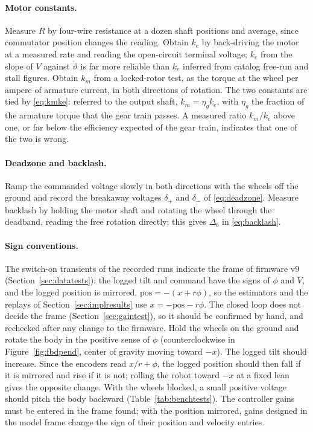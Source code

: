 \paragraph{Motor constants.} Measure $R$ by four-wire resistance at a dozen
shaft positions and average, since commutator position changes the reading.
Obtain $k_e$ by back-driving the motor at a measured rate and reading the
open-circuit terminal voltage; $k_e$ from the slope of $V$ against
$\dot\vartheta$ is far more reliable than $k_e$ inferred from catalog free-run
and stall figures. Obtain $k_m$ from a locked-rotor test, as the torque at the
wheel per ampere of armature current, in both directions of rotation. The two
constants are tied by \eqref{eq:kmke}: referred to the output shaft,
$k_m=\eta_gk_e$, with $\eta_g$ the fraction of the armature torque that the
gear train passes. A measured ratio $k_m/k_e$ above one, or far below the
efficiency expected of the gear train, indicates that one of the two is
wrong.

\paragraph{Deadzone and backlash.} Ramp the commanded voltage slowly in both
directions with the wheels off the ground and record the breakaway voltages
$\delta_+$ and $\delta_-$ of \eqref{eq:deadzone}. Measure backlash by holding
the motor shaft and rotating the wheel through the deadband, reading the
free rotation directly; this gives $\Delta_b$ in \eqref{eq:backlash}.

\paragraph{Sign conventions.} The switch-on transients of the recorded
runs indicate the frame of firmware v9 (Section~\ref{sec:datatests}): the
logged tilt and command have the signs of $\phi$ and $V$, and the logged
position is mirrored, $\mathrm{pos}=-(x+r\phi)$, so the estimators and the
replays of Section~\ref{sec:implresults} use $x=-\mathrm{pos}-r\phi$. The
closed loop does not decide the frame (Section~\ref{sec:gaintest}), so it
should be confirmed by hand, and rechecked after any change to the firmware.
Hold the wheels on the ground and rotate the body in the positive
sense of $\phi$ (counterclockwise in Figure~\ref{fig:fbdpend}, center of
gravity moving toward $-x$). The logged tilt should increase. Since the
encoders read $x/r+\phi$, the logged position should then fall if it is
mirrored and rise if it is not; rolling the robot toward $-x$ at a fixed lean
gives the opposite change. With the wheels blocked, a small positive voltage
should pitch the body backward (Table~\ref{tab:benchtests}). The controller
gains must be entered in the frame found; with the position mirrored, gains
designed in the model frame change the sign of their position and velocity
entries.

